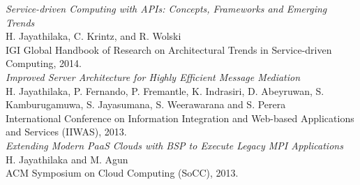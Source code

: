 \begin{vitae}
\textit{Service-driven Computing with APIs: Concepts, Frameworks and Emerging Trends} \\
H. Jayathilaka, C. Krintz, and R. Wolski \\
IGI Global Handbook of Research on Architectural Trends in Service-driven Computing, 2014. \\

\textit{Improved Server Architecture for Highly Efficient Message Mediation} \\
H. Jayathilaka, P. Fernando, P. Fremantle, K. Indrasiri, D. Abeyruwan, S. Kamburugamuwa, S. Jayasumana, S. Weerawarana and S. Perera \\
International Conference on Information Integration and Web-based Applications and Services (IIWAS), 2013. \\

\textit{Extending Modern PaaS Clouds with BSP to Execute Legacy MPI Applications} \\
H. Jayathilaka and M. Agun \\
ACM Symposium on Cloud Computing (SoCC), 2013. \\

\end{vitae}